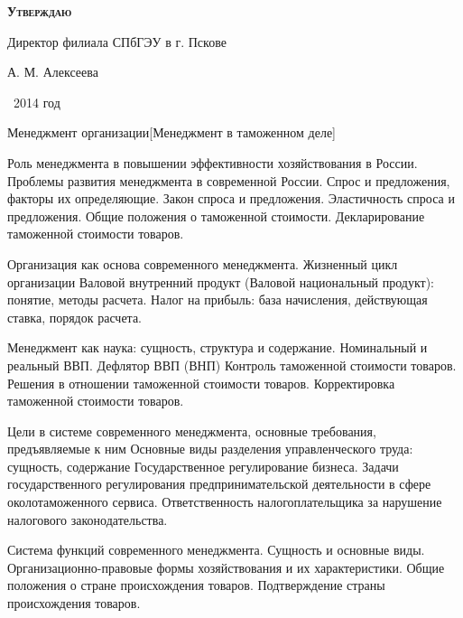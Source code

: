 \documentclass[
	11pt,
	a4paper,
	]
	{article}
\begin{document}
\newlength{\pblength}\settowidth{\pblength}{Директор филиала СПбГЭУ в г. Пскове}

\hfill\parbox{\pblength}{
	\textbf{\textsc{Утверждаю}}\medskip

	Директор филиала СПбГЭУ в г. Пскове\medskip

	\makebox[3cm]{\hrulefill} А. М. Алексеева\medskip

	\makebox[1.5cm]{<<\hrulefill>>} \makebox[3cm]{\hrulefill}\ 2014 год
}


 {Менеджмент организации}[Менеджмент в таможенном деле]

	

\noindent{} 
	{
		Роль менеджмента в повышении эффективности хозяйствования в России. Проблемы развития менеджмента в современной России.
	}{
		Спрос и предложения, факторы их определяющие. Закон спроса и предложения. Эластичность спроса и предложения.
	}{
		Общие положения о таможенной стоимости. Декларирование таможенной стоимости товаров.
	}

\bigskip

\noindent{} 
	{
		Организация как основа современного менеджмента. Жизненный цикл организации
	}{
		Валовой внутренний продукт (Валовой национальный продукт): понятие, методы расчета.
	}{
		Налог на прибыль: база начисления, действующая ставка, порядок расчета.
	}

\bigskip

\noindent{} 
	{
		Менеджмент как наука: сущность, структура и содержание.
	}{
		Номинальный и реальный ВВП. Дефлятор ВВП (ВНП)
	}{
		Контроль таможенной стоимости товаров. Решения в отношении таможенной стоимости товаров. Корректировка таможенной стоимости товаров.
	}

\bigskip

\noindent{} 
	{
		Цели в системе современного менеджмента, основные требования, предъявляемые к ним Основные виды разделения управленческого труда: сущность, содержание
	}{
		Государственное регулирование бизнеса. Задачи государственного регулирования предпринимательской деятельности в сфере околотаможенного сервиса.
	}{
		Ответственность налогоплательщика за нарушение налогового законодательства.
	}

\bigskip

\noindent{} 
	{
		Система функций современного менеджмента. Сущность и основные виды.
	}{
		Организационно-правовые формы хозяйствования и их характеристики.
	}{
		Общие положения о стране происхождения товаров. Подтверждение страны происхождения товаров.
	}
\end{document}
